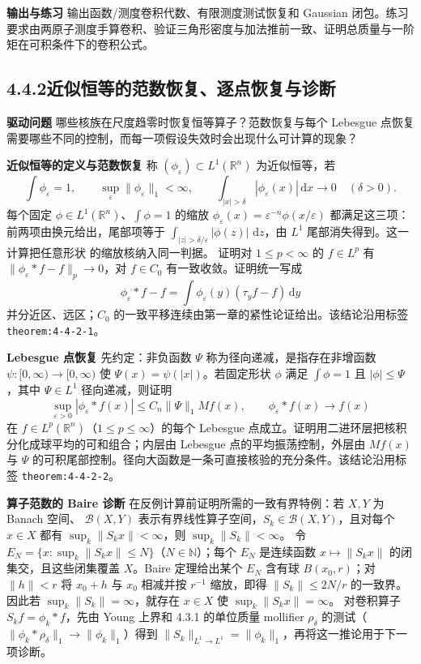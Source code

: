 \documentclass[11pt,a4paper]{ctexart}
\newcommand{\R}{\mathbb R}
\newcommand{\eps}{\varepsilon}
\newcommand{\dd}{\,\mathrm d}
\newcommand{\planitem}[1]{\par\smallskip\noindent\textcolor{deepblue}{\textbf{#1}}\quad}
\newcommand{\unithead}[2]{\subsection{#1\quad #2}}
\begin{document}
\planitem{输出与练习}
输出函数/测度卷积代数、有限测度测试恢复和 Gaussian 闭包。练习要求由两原子测度手算卷积、验证三角形密度与加法推前一致、证明总质量与一阶矩在可积条件下的卷积公式。

\unithead{4.4.2}{近似恒等的范数恢复、逐点恢复与诊断}

\planitem{驱动问题}
哪些核族在尺度趋零时恢复恒等算子？范数恢复与每个 Lebesgue 点恢复需要哪些不同的控制，而每一项假设失效时会出现什么可计算的现象？

\planitem{近似恒等的定义与范数恢复}
称 $(\phi_\eps)\subset L^1(\R^n)$ 为近似恒等，若
\[
 \int\phi_\eps=1,\qquad
 \sup_\eps\|\phi_\eps\|_1<\infty,\qquad
 \int_{|x|>\delta}|\phi_\eps(x)|\dd x\longrightarrow0
 \quad(\delta>0).
\]
每个固定 $\phi\in L^1(\R^n)$、$\int\phi=1$ 的缩放
$\phi_\eps(x)=\eps^{-n}\phi(x/\eps)$ 都满足这三项：前两项由换元给出，尾部项等于
$\int_{|z|>\delta/\eps}|\phi(z)|\,\dd z$，由 $L^1$ 尾部消失得到。这一计算把任意形状
的缩放核纳入同一判据。
证明对 $1\le p<\infty$ 的 $f\in L^p$ 有
$\|\phi_\eps*f-f\|_p\to0$，对 $f\in C_0$ 有一致收敛。证明统一写成
\[
\phi_\eps*f-f=
\int\phi_\eps(y)(\tau_yf-f)\dd y
\]
并分近区、远区；$C_0$ 的一致平移连续由第一章的紧性论证给出。该结论沿用标签 \texttt{theorem:4-4-2-1}。

\planitem{Lebesgue 点恢复}
先约定：非负函数 $\Psi$ 称为径向递减，是指存在非增函数
$\psi:[0,\infty)\to[0,\infty)$ 使 $\Psi(x)=\psi(|x|)$。若固定形状 $\phi$
满足 $\int\phi=1$ 且 $|\phi|\le\Psi$，其中 $\Psi\in L^1$ 径向递减，则证明
\[
\sup_{\eps>0}|\phi_\eps*f(x)|
\le C_n\|\Psi\|_1Mf(x),
\qquad
\phi_\eps*f(x)\to f(x)
\]
在 $f\in L^p(\R^n)$（$1\le p\le\infty$）的每个 Lebesgue 点成立。证明用二进环层把核积分化成球平均的可和组合；内层由 Lebesgue 点的平均振荡控制，外层由 $Mf(x)$ 与 $\Psi$ 的可积尾部控制。径向大函数是一条可直接核验的充分条件。该结论沿用标签 \texttt{theorem:4-4-2-2}。

\planitem{算子范数的 Baire 诊断}
在反例计算前证明所需的一致有界特例：若 $X,Y$ 为 Banach 空间、
$\mathcal B(X,Y)$ 表示有界线性算子空间，$S_k\in\mathcal B(X,Y)$，且对每个 $x\in X$ 都有
$\sup_k\|S_kx\|<\infty$，则 $\sup_k\|S_k\|<\infty$。
令 $E_N=\{x:\sup_k\|S_kx\|\le N\}$（$N\in\mathbb N$）；每个 $E_N$ 是连续函数
$x\mapsto\|S_kx\|$ 的闭集交，且这些闭集覆盖 $X$。Baire 定理给出某个
$E_N$ 含有球 $B(x_0,r)$；对 $\|h\|<r$ 将 $x_0+h$ 与 $x_0$ 相减并按 $r^{-1}$
缩放，即得 $\|S_k\|\le 2N/r$ 的一致界。
因此若 $\sup_k\|S_k\|=\infty$，就存在 $x\in X$ 使 $\sup_k\|S_kx\|=\infty$。
对卷积算子 $S_kf=\phi_k*f$，先由 Young 上界和 4.3.1 的单位质量 mollifier
$\rho_\delta$ 的测试（$\|\phi_k*\rho_\delta\|_1\to\|\phi_k\|_1$）得到
$\|S_k\|_{L^1\to L^1}=\|\phi_k\|_1$，再将这一推论用于下一项诊断。
\end{document}
